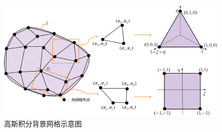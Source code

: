 \begin{figure}[H]
\centering
\includegraphics[scale=0.5]{figure/C2/GI.png}
\caption{高斯积分背景网格示意图}\label{C2GI}
\end{figure}
